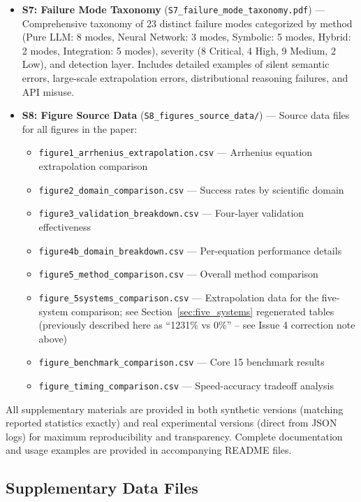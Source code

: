 \documentclass[twoside,11pt]{article}
\begin{document}
\begin{itemize}
\item \textbf{S7: Failure Mode Taxonomy} (\texttt{S7\_failure\_mode\_taxonomy.pdf}) --- Comprehensive taxonomy of 23 distinct failure modes categorized by method (Pure LLM: 8 modes, Neural Network: 3 modes, Symbolic: 5 modes, Hybrid: 2 modes, Integration: 5 modes), severity (8 Critical, 4 High, 9 Medium, 2 Low), and detection layer. Includes detailed examples of silent semantic errors, large-scale extrapolation errors, distributional reasoning failures, and API misuse.

\item \textbf{S8: Figure Source Data} (\texttt{S8\_figures\_source\_data/}) --- Source data files for all figures in the paper:
\begin{itemize}
\item \texttt{figure1\_arrhenius\_extrapolation.csv} --- Arrhenius equation extrapolation comparison
\item \texttt{figure2\_domain\_comparison.csv} --- Success rates by scientific domain
\item \texttt{figure3\_validation\_breakdown.csv} --- Four-layer validation effectiveness
\item \texttt{figure4b\_domain\_breakdown.csv} --- Per-equation performance details
\item \texttt{figure5\_method\_comparison.csv} --- Overall method comparison
\item \texttt{figure\_5systems\_comparison.csv} --- Extrapolation data for the five-system comparison; see Section~\ref{sec:five_systems} regenerated tables (previously described here as ``1231\% vs 0\%'' -- see Issue 4 correction note above)
\item \texttt{figure\_benchmark\_comparison.csv} --- Core 15 benchmark results
\item \texttt{figure\_timing\_comparison.csv} --- Speed-accuracy tradeoff analysis
\end{itemize}
\end{itemize}

All supplementary materials are provided in both synthetic versions (matching reported statistics exactly) and real experimental versions (direct from JSON logs) for maximum reproducibility and transparency. Complete documentation and usage examples are provided in accompanying README files.

\subsection{Supplementary Data Files}
\end{document}
